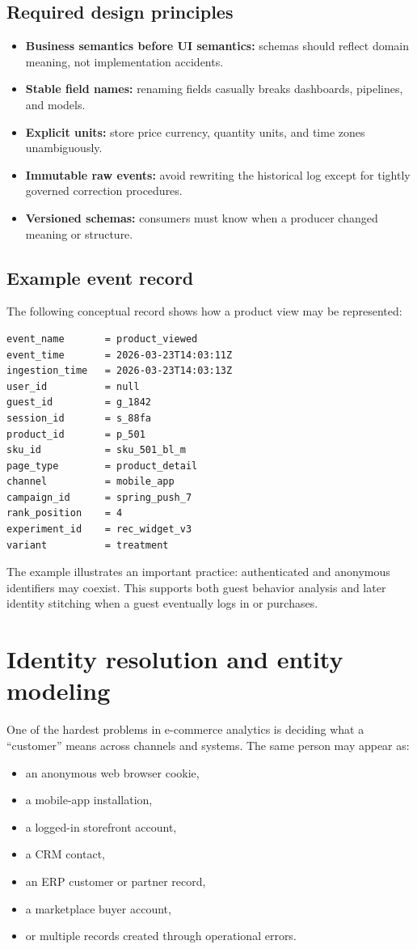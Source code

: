 \subsection{Required design principles}
\begin{itemize}
  \item \textbf{Business semantics before UI semantics:} schemas should reflect domain meaning, not implementation accidents.
  \item \textbf{Stable field names:} renaming fields casually breaks dashboards, pipelines, and models.
  \item \textbf{Explicit units:} store price currency, quantity units, and time zones unambiguously.
  \item \textbf{Immutable raw events:} avoid rewriting the historical log except for tightly governed correction procedures.
  \item \textbf{Versioned schemas:} consumers must know when a producer changed meaning or structure.
\end{itemize}

\subsection{Example event record}
The following conceptual record shows how a product view may be represented:
\begin{verbatim}
event_name       = product_viewed
event_time       = 2026-03-23T14:03:11Z
ingestion_time   = 2026-03-23T14:03:13Z
user_id          = null
guest_id         = g_1842
session_id       = s_88fa
product_id       = p_501
sku_id           = sku_501_bl_m
page_type        = product_detail
channel          = mobile_app
campaign_id      = spring_push_7
rank_position    = 4
experiment_id    = rec_widget_v3
variant          = treatment
\end{verbatim}

The example illustrates an important practice: authenticated and anonymous identifiers may coexist.
This supports both guest behavior analysis and later identity stitching when a guest eventually logs in or purchases.

\section{Identity resolution and entity modeling}
One of the hardest problems in e-commerce analytics is deciding what a ``customer'' means across channels and systems.
The same person may appear as:
\begin{itemize}
  \item an anonymous web browser cookie,
  \item a mobile-app installation,
  \item a logged-in storefront account,
  \item a CRM contact,
  \item an ERP customer or partner record,
  \item a marketplace buyer account,
  \item or multiple records created through operational errors.
\end{itemize}

